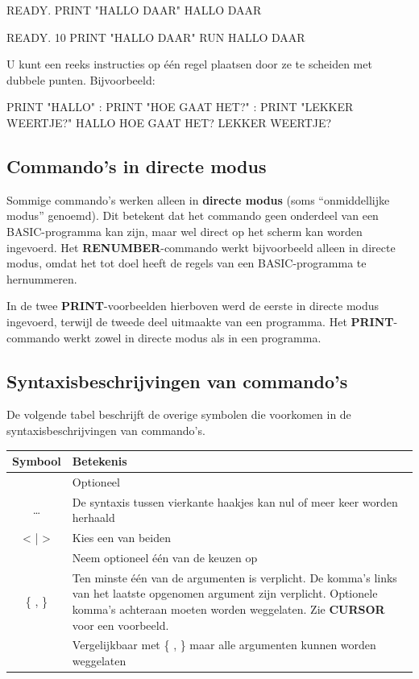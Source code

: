 \begin{screencode}
READY.
PRINT "HALLO DAAR"
HALLO DAAR

READY.
10 PRINT "HALLO DAAR"
RUN
HALLO DAAR
\end{screencode}

U kunt een reeks instructies op één regel plaatsen door ze te scheiden met dubbele punten. Bijvoorbeeld:

\begin{screencode}
PRINT "HALLO" : PRINT "HOE GAAT HET?" : PRINT "LEKKER WEERTJE?"
HALLO
HOE GAAT HET?
LEKKER WEERTJE?
\end{screencode}

\subsection{Commando's in directe modus}
Sommige commando's werken alleen in {\bf directe modus} (soms ``onmiddellijke modus'' genoemd). Dit betekent dat het commando geen onderdeel van een BASIC-programma kan zijn, maar wel direct op het scherm kan worden ingevoerd. Het {\bf RENUMBER}-commando werkt bijvoorbeeld alleen in directe modus, omdat het tot doel heeft de regels van een BASIC-programma te hernummeren.

In de twee {\bf PRINT}-voorbeelden hierboven werd de eerste in directe modus ingevoerd, terwijl de tweede deel uitmaakte van een programma. Het {\bf PRINT}-commando werkt zowel in directe modus als in een programma.

\subsection{Syntaxisbeschrijvingen van commando's}De volgende tabel beschrijft de overige symbolen die voorkomen in de syntaxisbeschrijvingen van commando's.

\begin{center}
    \begin{longtable}{|c|L{8cm}|}
        \hline
        \textbf{Symbool} & \textbf{Betekenis}\\
        \hline
        \endhead
        [ ] &        Optioneel \\
        \hline
        \dots &
        De syntaxis tussen vierkante haakjes kan nul of meer keer worden herhaald \\
        \hline
< | > &        Kies een van beiden \\
        \hline
        [ | ] &        Neem optioneel één van de keuzen op \\
        \hline
\{ , \} &        Ten minste één van de argumenten is verplicht. De komma's links van het laatste        opgenomen argument zijn verplicht. Optionele komma's achteraan moeten worden weggelaten. Zie        {\bf CURSOR} voor een voorbeeld.\\
        \hline
        [\{ , \}] &        Vergelijkbaar met \{ , \} maar alle argumenten kunnen worden weggelaten\\
        \hline

    \end{longtable}
\end{center}

